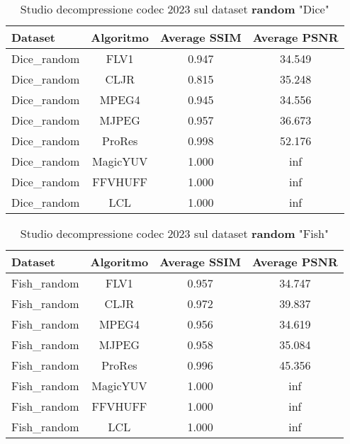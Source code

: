 \begin{table}[ht]
\centering
\begin{tabular}{|l|c|c|c|}
\hline
Dataset               & Algoritmo & Average SSIM & Average PSNR
\\ \hline
Dice\_random          & FLV1      & 0.947        & 34.549       \\ \hline
Dice\_random          & CLJR      & 0.815        & 35.248       \\ \hline
Dice\_random          & MPEG4     & 0.945        & 34.556       \\ \hline
Dice\_random          & MJPEG     & 0.957        & 36.673       \\ \hline
Dice\_random          & ProRes    & 0.998        & 52.176       \\ \hline
Dice\_random          & MagicYUV  & 1.000        & inf          \\ \hline
Dice\_random          & FFVHUFF   & 1.000        & inf          \\ \hline
Dice\_random          & LCL       & 1.000        & inf          \\ \hline
\end{tabular}
\caption{Studio decompressione codec 2023 sul dataset \textbf{random} "Dice"}
\end{table}

\begin{table}[!ht]
\centering
\begin{tabular}{|l|c|c|c|}
\hline
Dataset               & Algoritmo & Average SSIM & Average PSNR
\\ \hline
Fish\_random          & FLV1      & 0.957        & 34.747       \\ \hline
Fish\_random          & CLJR      & 0.972        & 39.837       \\ \hline
Fish\_random          & MPEG4     & 0.956        & 34.619       \\ \hline
Fish\_random          & MJPEG     & 0.958        & 35.084       \\ \hline
Fish\_random          & ProRes    & 0.996        & 45.356       \\ \hline
Fish\_random          & MagicYUV  & 1.000        & inf          \\ \hline
Fish\_random          & FFVHUFF   & 1.000        & inf          \\ \hline
Fish\_random          & LCL       & 1.000        & inf          \\ \hline
\end{tabular}
\caption{Studio decompressione codec 2023 sul dataset \textbf{random} "Fish"}
\end{table}

